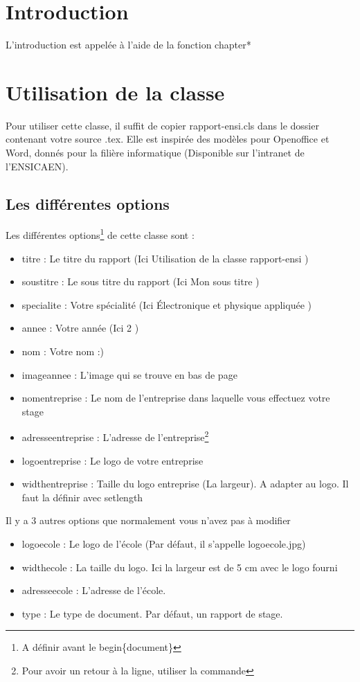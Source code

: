 \documentclass[times]{rapport-ensi}
\begin{document}
 \fairetitre
 \tableofcontents
\chapter*{Introduction}
L'introduction est appelée à l'aide de la fonction chapter*
\chapter{Utilisation de la classe}
Pour utiliser cette classe, il suffit de copier rapport-ensi.cls dans le dossier contenant votre source .tex. 
Elle est inspirée des modèles pour Openoffice et Word, donnés pour la filière informatique (Disponible sur l'intranet
de l'ENSICAEN).

\section{Les différentes options}
Les différentes options\footnote{A définir avant le begin\{document\}} de cette classe sont :
\begin{itemize}
\item titre : Le titre du rapport (Ici \og{}Utilisation de la classe rapport-ensi\fg{} )
\item soustitre : Le sous titre du rapport (Ici \og{}Mon sous titre\fg{} )
\item specialite : Votre spécialité (Ici \og{}Électronique et physique appliquée\fg{} )
\item annee : Votre année (Ici \og{}2\ieme\fg{} )
\item nom : Votre nom :)
\item imageannee : L'image qui se trouve en bas de page
\item nomentreprise : Le nom de l'entreprise dans laquelle vous effectuez votre stage
\item adresseentreprise : L'adresse de l'entreprise\footnote{Pour avoir un retour à la ligne, utiliser la commande \newline}
\item logoentreprise : Le logo de votre entreprise
\item widthentreprise : Taille du logo entreprise (La largeur). A adapter au logo. Il faut la définir avec setlength
\end{itemize}
Il y a 3 autres options que normalement vous n'avez pas à modifier
\begin{itemize}
\item logoecole : Le logo de l'école (Par défaut, il s'appelle logoecole.jpg)
\item widthecole : La taille du logo. Ici la largeur est de 5 cm avec le logo fourni
\item adresseecole : L'adresse de l'école.
\item type : Le type de document. Par défaut, un rapport de stage.
\end{itemize}
\end{document}
